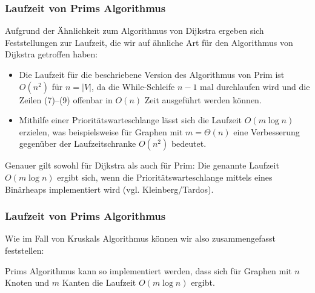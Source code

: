 \documentclass[smaller,xcolor=dvipsnames]{beamer}
\begin{document}
\begin{frame}
\frametitle{Laufzeit von Prims Algorithmus}
Aufgrund der Ähnlichkeit zum Algorithmus von Dijkstra ergeben sich Feststellungen zur Laufzeit, die wir auf ähnliche Art für den Algorithmus von Dijkstra getroffen haben:
\begin{itemize}
	\item Die Laufzeit für die beschriebene Version des Algorithmus von Prim ist $O(n^2)$ für $n=|V|$, da die While-Schleife $n-1$ mal durchlaufen wird und die Zeilen (7)--(9) offenbar in $O(n)$ Zeit ausgeführt werden können.
	\item Mithilfe einer Prioritätswarteschlange lässt sich die Laufzeit $O(m \log n)$ erzielen, was beispielsweise für Graphen mit $m = \Theta(n)$ eine Verbesserung gegenüber der Laufzeitschranke $O(n^2)$ bedeutet.
\end{itemize}
Genauer gilt sowohl für Dijkstra als auch für Prim: \alert{Die genannte Laufzeit $O(m \log n)$ ergibt sich, wenn die Prioritätswarteschlange mittels eines Binärheaps implementiert wird (vgl. Kleinberg/Tardos)}.
\end{frame}

\begin{frame}
\frametitle{Laufzeit von Prims Algorithmus}
Wie im Fall von Kruskals Algorithmus können wir also zusammengefasst feststellen:

\begin{center}
	\alert{Prims Algorithmus kann so implementiert werden, dass sich für Graphen mit $n$ Knoten und $m$ Kanten die Laufzeit $O(m \log n)$ ergibt.}
\end{center}
\end{frame}
\end{document}
